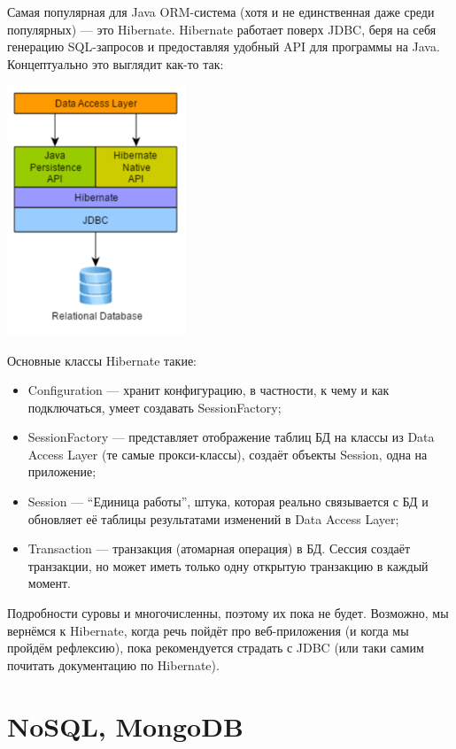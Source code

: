 \documentclass[a5paper]{article}
\begin{document}
Самая популярная для Java ORM-система (хотя и не единственная даже среди популярных) --- это Hibernate. Hibernate работает поверх JDBC, беря на себя генерацию SQL-запросов и предоставляя удобный API для программы на Java. Концептуально это выглядит как-то так:

\begin{center}
	\includegraphics[width=0.4\textwidth]{hibernate.png}
\end{center}

Основные классы Hibernate такие:

\begin{itemize}
	\item Configuration --- хранит конфигурацию, в частности, к чему и как подключаться, умеет создавать SessionFactory;
	\item SessionFactory --- представляет отображение таблиц БД на классы из Data Access Layer (те самые прокси-классы), создаёт объекты Session, одна на приложение;
	\item Session --- ``Единица работы'', штука, которая реально связывается с БД и обновляет её таблицы результатами изменений в Data Access Layer;
	\item Transaction --- транзакция (атомарная операция) в БД. Сессия создаёт транзакции, но может иметь только одну открытую транзакцию в каждый момент.
\end{itemize}

Подробности суровы и многочисленны, поэтому их пока не будет. Возможно, мы вернёмся к Hibernate, когда речь пойдёт про веб-приложения (и когда мы пройдём рефлексию), пока рекомендуется страдать с JDBC (или таки самим почитать документацию по Hibernate).

\section{NoSQL, MongoDB}
\end{document}
